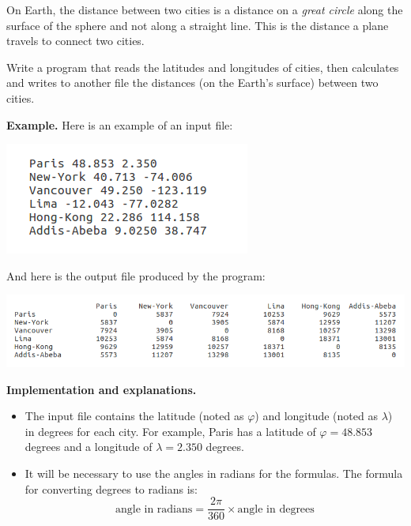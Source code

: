 \documentclass[11pt,class=report,crop=false]{standalone}
\begin{document}
\begin{activite}
\begin{enumerate}
On Earth, the distance between two cities is a distance on a \emph{great circle} along the surface of the sphere and not along a straight line. This is the distance a plane travels to connect two cities.

 Write a program that reads the latitudes and longitudes of cities, then calculates and writes to another file the distances (on the Earth's surface) between two cities. 
  
\textbf{Example.} Here is an example of an input file:
\begin{center}
\includegraphics[scale=\myscale,scale=0.7]{screen-files-4c}
\end{center}   

And here is the output file produced by the program:

\vspace*{-3ex}

\begin{center}
\includegraphics[scale=\myscale,scale=0.55]{screen-files-4d} 
\end{center}  
    
    
\textbf{Implementation and explanations.}

\begin{itemize}
	\item The input file contains the latitude (noted as $\varphi$) and longitude (noted as $\lambda$) in degrees for each city. For example, Paris has a latitude of $\varphi = 48.853$ degrees and a longitude of $\lambda = 2.350$ degrees.
	
	\item It will be necessary to use the angles in radians for the formulas. The formula for converting degrees to radians is: 
	$$\text{angle in radians} = \frac{2\pi}{360} \times \text{angle in degrees}$$
		

\end{itemize}
\end{enumerate}
\end{activite}
\end{document}
